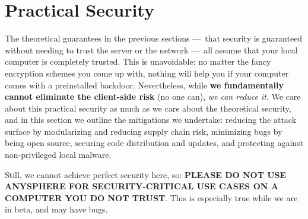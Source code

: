 \section{Practical Security}

The theoretical guarantees in the previous sections — that security is guaranteed without needing to trust
the server or the network — all assume that your local computer is completely trusted. This is unavoidable: no matter the fancy encryption schemes you come up with, nothing will help you if your computer comes with a preinstalled backdoor. Nevertheless, while \textbf{we fundamentally cannot eliminate the client-side risk} (no one can), \textit{we can reduce it}. We care about this practical security as much as we care about the theoretical security, and in this section we outline the mitigations we undertake: reducing the attack surface by modularizing and reducing supply chain risk, minimizing bugs by being open source, securing code distribution and updates, and protecting against non-privileged local malware.

Still, we cannot achieve perfect security here, so: \textbf{PLEASE DO NOT USE ANYSPHERE FOR SECURITY-CRITICAL USE CASES ON A COMPUTER YOU DO NOT TRUST}. This is especially true while we are in beta, and may have bugs.




